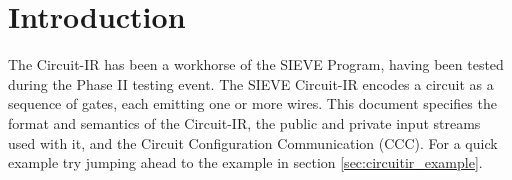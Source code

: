 \section{Introduction}
The Circuit-IR has been a workhorse of the SIEVE Program, having been tested during the Phase II testing event.
The SIEVE Circuit-IR encodes a circuit as a sequence of gates, each emitting one or more wires.
This document specifies the format and semantics of the Circuit-IR, the public and private input streams used with it, and the Circuit Configuration Communication (CCC).
For a quick example try jumping ahead to the example in section \ref{sec:circuitir_example}.
